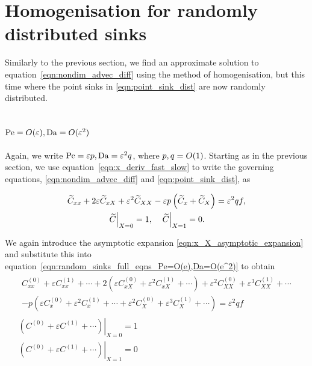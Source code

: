 \section{Homogenisation for randomly distributed sinks}
Similarly to the previous section, we find an approximate solution to
equation~\eqref{eqn:nondim_advec_diff} using the method of homogenisation, but
this time where the point sinks in \eqref{eqn:point_sink_dist} are now randomly
distributed.

\subsection{\(\mathrm{Pe} = O(\varepsilon), \mathrm{Da} = O(\varepsilon^2)\)}
Again, we write \(\mathrm{Pe} = \varepsilon p, \mathrm{Da} = \varepsilon^2 q\), where \(p,q =
O(1)\). Starting as in the previous section, we use
equation~\eqref{eqn:x_deriv_fast_slow} to write the governing equations,
\eqref{eqn:nondim_advec_diff} and \eqref{eqn:point_sink_dist}, as

\begin{subequations}
    \label{eqn:random_sinks_full_eqns_Pe=O(e),Da=O(e^2)}
    \begin{gather}
        \label{eqn:random_sinks_full_eqns_Pe=O(e),Da=O(e^2)_eq}
        \widetilde{C}_{xx} + 2\varepsilon\widetilde{C}_{xX} + \varepsilon^2\widetilde{C}_{XX}
        - \varepsilon p\left(\widetilde{C}_x + \widetilde{C}_X\right) = \varepsilon^2 q f,\\
        \label{eqn:random_sinks_full_eqns_Pe=O(e),Da=O(e^2)_bcs}
        \left.\widetilde{C}\right|_{X=0} = 1, \quad \left.\widetilde{C}\right|_{X=1} = 0.
    \end{gather}
\end{subequations}

We again introduce the asymptotic expansion \eqref{eqn:x_X_asymptotic_expansion}
and substitute this into
equation~\eqref{eqn:random_sinks_full_eqns_Pe=O(e),Da=O(e^2)} to obtain
\begin{subequations}
    \label{eqn:random_sinks_expanded_Pe=O(e),Da=O(e^2)}
    \begin{gather}
        \label{eqn:random_sinks_expanded_Pe=O(e),Da=O(e^2)_eq}
        \begin{gathered}
            C^{(0)}_{xx} + \varepsilon C^{(1)}_{xx} + \dotsb +
            2\left(\varepsilon C^{(0)}_{xX} + \varepsilon^2 C^{(1)}_{xX} +
            \dotsb\right) + \varepsilon^2 C^{(0)}_{XX} + \varepsilon^3
            C^{(1)}_{XX} + \dotsb\\
            - p\left(\varepsilon C^{(0)}_x + \varepsilon^2 C^{(1)}_x + \dotsb +
            \varepsilon^2 C^{(0)}_X + \varepsilon^3 C^{(1)}_X + \dotsb \right) =
            \varepsilon^2 q f
        \end{gathered}\\
        \label{eqn:random_sinks_expanded_Pe=O(e),Da=O(e^2)_bc_X=0}
        \left.\left(C^{(0)} + \varepsilon C^{(1)} + \dotsb
        \right)\right|_{X=0}=1\\
        \label{eqn:random_sinks_expanded_Pe=O(e),Da=O(e^2)_bc_X=1}
        \left.\left(C^{(0)} + \varepsilon C^{(1)} + \dotsb
        \right)\right|_{X=1}=0
    \end{gather}
\end{subequations}

